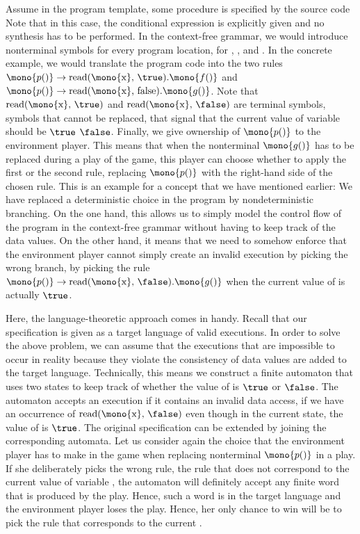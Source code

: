 \documentclass[../../diss.tex]{subfiles}
\begin{document}
Assume in the program template, some procedure  is specified by the source code 
Note that in this case, the conditional expression is explicitly given and no synthesis has to be performed.
In the context-free grammar, we would introduce nonterminal symbols for every program location, \eg for , , and .
In the concrete example, we would translate the program code into the two rules $\mono{p()} \to \text{read(\mono{x}, \true)}.\mono{f()}$ and $\mono{p()} \to \text{read(\mono{x}, false)}.\mono{g()}$.
Note that $\text{read(\mono{x}, \true)}$ and $\text{read(\mono{x}, \false)}$ are terminal symbols, symbols that cannot be replaced, that signal that the current value of variable  should be $\true$ \resp $\false$.
Finally, we give ownership of $\mono{p()}$ to the environment player.
This means that when the nonterminal $\mono{g()}$ has to be replaced during a play of the game, this player can choose whether to apply the first or the second rule, replacing $\mono{p()}$ with the right-hand side of the chosen rule.
This is an example for a concept that we have mentioned earlier:
We have replaced a deterministic choice in the program by nondeterministic branching.
On the one hand, this allows us to simply model the control flow of the program in the context-free grammar without having to keep track of the data values.
On the other hand, it means that we need to somehow enforce that the environment player cannot simply create an invalid execution by picking the wrong branch, \eg by picking the rule $\mono{p()} \to \text{read(\mono{x}, \false)}.\mono{g()}$ when the current value of  is actually $\true$.

Here, the language-theoretic approach comes in handy.
Recall that our specification is given as a target language of valid executions.
In order to solve the above problem, we can assume that the executions that are impossible to occur in reality because they violate the consistency of data values are added to the target language.
Technically, this means we construct a finite automaton that uses two states to keep track of whether the value of  is $\true$ or $\false$.
The automaton accepts an execution if it contains an invalid data access, \eg if we have an occurrence of $\text{read(\mono{x}, \false)}$ even though in the current state, the value of  is $\true$.
The original specification can be extended by joining the corresponding automata.
Let us consider again the choice that the environment player has to make in the game when replacing nonterminal $\mono{p()}$ in a play.
If she deliberately picks the wrong rule, \ie the rule that does not correspond to the current value of variable , the automaton will definitely accept any finite word that is produced by the play.
Hence, such a word is in the target language and the environment player loses the play.
Hence, her only chance to win will be to pick the rule that corresponds to the current .
\end{document}

